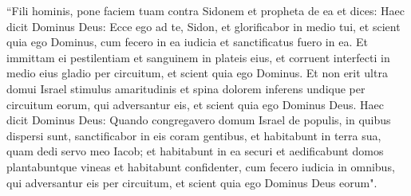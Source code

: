 \begin{biblechapter}
\verse “Fili hominis, pone faciem tuam contra Sidonem et propheta de ea 
\verse et dices: Haec dicit Dominus Deus: Ecce ego ad te, Sidon, et glorificabor in medio tui, et scient quia ego Dominus, cum fecero in ea iudicia et sanctificatus fuero in ea. 
\verse Et immittam ei pestilentiam et sanguinem in plateis eius, et corruent interfecti in medio eius gladio per circuitum, et scient quia ego Dominus. 
\verse Et non erit ultra domui Israel stimulus amaritudinis et spina dolorem inferens undique per circuitum eorum, qui adversantur eis, et scient quia ego Dominus Deus. 
\verse Haec dicit Dominus Deus: Quando congregavero domum Israel de populis, in quibus dispersi sunt, sanctificabor in eis coram gentibus, et habitabunt in terra sua, quam dedi servo meo Iacob; 
\verse et habitabunt in ea securi et aedificabunt domos plantabuntque vineas et habitabunt confidenter, cum fecero iudicia in omnibus, qui adversantur eis per circuitum, et scient quia ego Dominus Deus eorum". 
\end{biblechapter}

